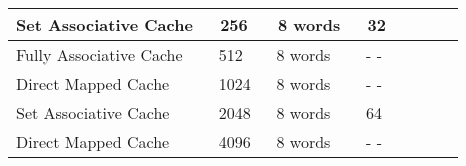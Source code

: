 \documentclass[addpoints]{exam}
\begin{document}
\begin{sloppypar}
\begin{questions}
\begin{tabular}{|p{20mm} | p{10mm} | p{15mm} |p{10mm} |p{20mm} |p{15mm} |p{10mm} |p{10mm} |}
        \raggedright Set \newline Associative Cache & \textcolor{white}{.} \newline \hspace*{1mm} 256 & \textcolor{white}{.} \newline \hspace*{1mm} 8 words & \textcolor{white}{.} \newline \hspace*{2mm} 32 & & & & \\ \hline
        \raggedright Fully \newline Associative Cache & \textcolor{white}{.} \newline \hspace*{1mm} 512 & \textcolor{white}{.} \newline \hspace*{1mm} 8 words & \textcolor{white}{.} \newline \hspace*{1mm} - - & & & & \\ \hline
        \raggedright Direct Mapped Cache & \textcolor{white}{.} \newline \hspace*{0mm} 1024 & \textcolor{white}{.} \newline \hspace*{1mm} 8 words & \textcolor{white}{.} \newline \hspace*{1mm} - - & & & & \\ \hline
        \raggedright Set \newline Associative Cache & \textcolor{white}{.} \newline \hspace*{0mm} 2048 & \textcolor{white}{.} \newline \hspace*{1mm} 8 words & \textcolor{white}{.} \newline \hspace*{2mm} 64 & & & & \\ \hline
        \raggedright Direct Mapped Cache & \textcolor{white}{.} \newline \hspace*{0mm} 4096 & \textcolor{white}{.} \newline \hspace*{1mm} 8 words & \textcolor{white}{.} \newline \hspace*{1mm} - - & & & & \\ \hline 
    \end{tabular}


\end{questions}
\end{sloppypar}
\end{document}
